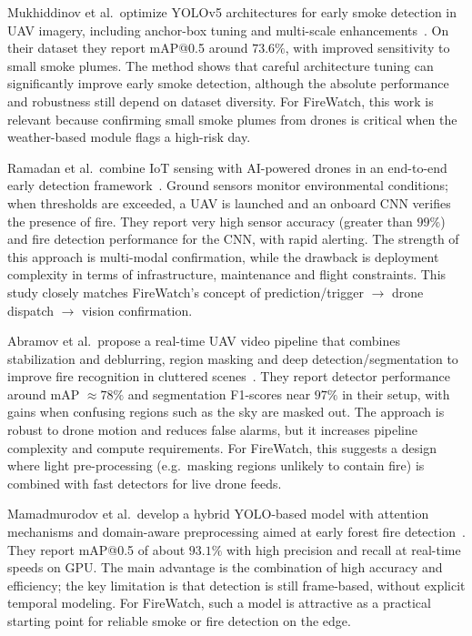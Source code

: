 \documentclass[11pt,a4paper]{report}
\begin{document}
Mukhiddinov et al.\ optimize YOLOv5 architectures for early smoke detection in UAV imagery, including anchor-box tuning and multi-scale enhancements~\cite{mukhiddinov2022}. On their dataset they report mAP@0.5 around $73.6\%$, with improved sensitivity to small smoke plumes. The method shows that careful architecture tuning can significantly improve early smoke detection, although the absolute performance and robustness still depend on dataset diversity. For FireWatch, this work is relevant because confirming small smoke plumes from drones is critical when the weather-based module flags a high-risk day.

Ramadan et al.\ combine IoT sensing with AI-powered drones in an end-to-end early detection framework~\cite{ramadan2024}. Ground sensors monitor environmental conditions; when thresholds are exceeded, a UAV is launched and an onboard CNN verifies the presence of fire. They report very high sensor accuracy (greater than $99\%$) and fire detection performance for the CNN, with rapid alerting. The strength of this approach is multi-modal confirmation, while the drawback is deployment complexity in terms of infrastructure, maintenance and flight constraints. This study closely matches FireWatch's concept of prediction/trigger $\rightarrow$ drone dispatch $\rightarrow$ vision confirmation.

Abramov et al.\ propose a real-time UAV video pipeline that combines stabilization and deblurring, region masking and deep detection/segmentation to improve fire recognition in cluttered scenes~\cite{abramov2024}. They report detector performance around mAP $\approx 78\%$ and segmentation F1-scores near $97\%$ in their setup, with gains when confusing regions such as the sky are masked out. The approach is robust to drone motion and reduces false alarms, but it increases pipeline complexity and compute requirements. For FireWatch, this suggests a design where light pre-processing (e.g.\ masking regions unlikely to contain fire) is combined with fast detectors for live drone feeds.

Mamadmurodov et al.\ develop a hybrid YOLO-based model with attention mechanisms and domain-aware preprocessing aimed at early forest fire detection~\cite{mamadmurodov2025}. They report mAP@0.5 of about $93.1\%$ with high precision and recall at real-time speeds on GPU. The main advantage is the combination of high accuracy and efficiency; the key limitation is that detection is still frame-based, without explicit temporal modeling. For FireWatch, such a model is attractive as a practical starting point for reliable smoke or fire detection on the edge.
\end{document}
